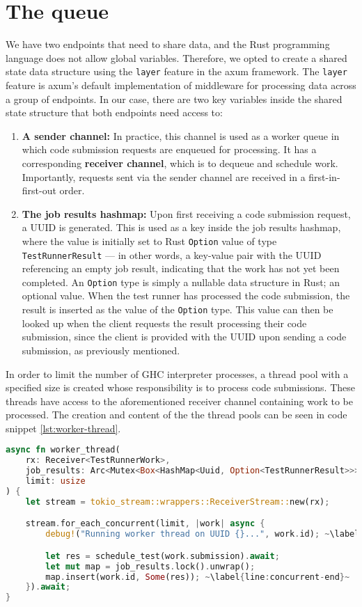 \section{The queue}
We have two endpoints that need to share data, and the Rust programming language does not allow global variables.
Therefore, we opted to create a shared state data structure using the \texttt{layer} feature in the axum framework.
The \texttt{layer} feature is axum's default implementation of middleware for processing data across a group of endpoints.
In our case, there are two key variables inside the shared state structure that both endpoints need access to:
\begin{enumerate}
    \item \textbf{A sender channel:} In practice, this channel is used as a worker queue in which code submission requests are enqueued for processing. It has a corresponding \textbf{receiver channel}, which is to dequeue and schedule work. Importantly, requests sent via the sender channel are received in a first-in-first-out order.
    \item \textbf{The job results hashmap:} Upon first receiving a code submission request, a UUID is generated. This is used as a key inside the job results hashmap, where the value is initially set to Rust \texttt{Option} value of type \texttt{TestRunnerResult} --- in other words, a key-value pair with the UUID referencing an empty job result, indicating that the work has not yet been completed. An \texttt{Option} type is simply a nullable data structure in Rust; an optional value. When the test runner has processed the code submission, the result is inserted as the value of the \texttt{Option} type. This value can then be looked up when the client requests the result processing their code submission, since the client is provided with the UUID upon sending a code submission, as previously mentioned.
\end{enumerate}

In order to limit the number of GHC interpreter processes, a thread pool with a specified size is created whose responsibility is to process code submissions.
These threads have access to the aforementioned receiver channel containing work to be processed.
The creation and content of the the thread pools can be seen in code snippet \ref{lst:worker-thread}.

\begin{lstlisting}[language=rust, escapechar=~, caption={Rust code showing allocation of thread pools and scheduling of code submission processing.}, label={lst:worker-thread}]
async fn worker_thread(
    rx: Receiver<TestRunnerWork>,
    job_results: Arc<Mutex<Box<HashMap<Uuid, Option<TestRunnerResult>>>>>,
    limit: usize
) {
    let stream = tokio_stream::wrappers::ReceiverStream::new(rx);

    stream.for_each_concurrent(limit, |work| async {
        debug!("Running worker thread on UUID {}...", work.id); ~\label{line:concurrent-start}~

        let res = schedule_test(work.submission).await;
        let mut map = job_results.lock().unwrap();
        map.insert(work.id, Some(res)); ~\label{line:concurrent-end}~
    }).await;
}
\end{lstlisting}

